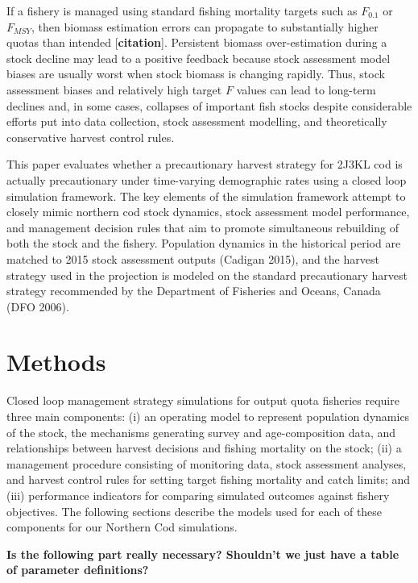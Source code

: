 \documentclass[12pt,]{article}
\begin{document}
If a fishery is managed using standard fishing mortality targets such as
\(F_{0.1}\) or \(F_{MSY}\), then biomass estimation errors can propagate
to substantially higher quotas than intended {[}\textbf{citation}{]}.
Persistent biomass over-estimation during a stock decline may lead to a
positive feedback because stock assessment model biases are usually
worst when stock biomass is changing rapidly. Thus, stock assessment
biases and relatively high target \(F\) values can lead to long-term
declines and, in some cases, collapses of important fish stocks despite
considerable efforts put into data collection, stock assessment
modelling, and theoretically conservative harvest control rules.

This paper evaluates whether a precautionary harvest strategy for 2J3KL
cod is actually precautionary under time-varying demographic rates using
a closed loop simulation framework. The key elements of the simulation
framework attempt to closely mimic northern cod stock dynamics, stock
assessment model performance, and management decision rules that aim to
promote simultaneous rebuilding of both the stock and the fishery.
Population dynamics in the historical period are matched to 2015 stock
assessment outputs (Cadigan 2015), and the harvest strategy used in the
projection is modeled on the standard precautionary harvest strategy
recommended by the Department of Fisheries and Oceans, Canada (DFO
2006).

\section{Methods}\label{methods}

Closed loop management strategy simulations for output quota fisheries
require three main components: (i) an operating model to represent
population dynamics of the stock, the mechanisms generating survey and
age-composition data, and relationships between harvest decisions and
fishing mortality on the stock; (ii) a management procedure consisting
of monitoring data, stock assessment analyses, and harvest control rules
for setting target fishing mortality and catch limits; and (iii)
performance indicators for comparing simulated outcomes against fishery
objectives. The following sections describe the models used for each of
these components for our Northern Cod simulations.

\textbf{Is the following part really necessary? Shouldn't we just have a
table of parameter definitions?}
\end{document}

